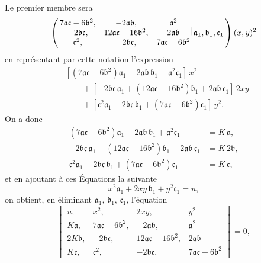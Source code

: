 \documentclass[11pt,a4paper]{book}
\theoremstyle{plain}
\newcommand{\wrule}{\hspace{-0.1em}\mid\hspace{-0.1em}}
\begin{document}
Le premier membre sera
\[
\left(\,\begin{matrix} 7\mathfrak{a}\mathfrak{c}-6\mathfrak{b}^2, & -2\mathfrak{a}\mathfrak{b}, & \mathfrak{a}^2\\
-2\mathfrak{b}\mathfrak{c}, & 12\mathfrak{a}\mathfrak{c}-16\mathfrak{b}^2, & 2\mathfrak{a}\mathfrak{b}\\
\mathfrak{c}^2, & -2\mathfrak{b}\mathfrak{c}, & 7\mathfrak{a}\mathfrak{c}-6\mathfrak{b}^2\end{matrix}\,\raisebox{0.5ex}{$\wrule$}\,\mathfrak{a}_1,\mathfrak{b}_1,\mathfrak{c}_1\,\right)(x,y)^2
\]
en repr\'{e}sentant par cette notation l'expression
\begin{align*}
&[(7\mathfrak{a}\mathfrak{c}-6\mathfrak{b}^2)\mathfrak{a}_1-2\mathfrak{a}\mathfrak{b}\,\mathfrak{b}_1+\mathfrak{a}^2\mathfrak{c}_1]\,x^2\\
&\qquad +[-2\mathfrak{b}\mathfrak{c}\,\mathfrak{a}_1+(12\mathfrak{a}\mathfrak{c}-16\mathfrak{b}^2)\mathfrak{b}_1+2\mathfrak{a}\mathfrak{b}\,\mathfrak{c}_1]\,2xy\\
&\qquad +[\mathfrak{c}^2\mathfrak{a}_1-2\mathfrak{b}\mathfrak{c}\,\mathfrak{b}_1+(7\mathfrak{a}\mathfrak{c}-6\mathfrak{b}^2)\mathfrak{c}_1]\,y^2.
\end{align*}
On a donc
\begin{align*}
(7\mathfrak{a}\mathfrak{c}-6\mathfrak{b}^2)\mathfrak{a}_1-2\mathfrak{a}\mathfrak{b}\,\mathfrak{b}_1+\mathfrak{a}^2\mathfrak{c}_1 &= K\,\mathfrak{a},\\
-2\mathfrak{b}\mathfrak{c}\,\mathfrak{a}_1+(12\mathfrak{a}\mathfrak{c}-16\mathfrak{b}^2)\mathfrak{b}_1+2\mathfrak{a}\mathfrak{b}\,\mathfrak{c}_1 &= K\,2\mathfrak{b},\\
\mathfrak{c}^2\mathfrak{a}_1-2\mathfrak{b}\mathfrak{c}\,\mathfrak{b}_1+(7\mathfrak{a}\mathfrak{c}-6\mathfrak{b}^2)\mathfrak{c}_1 &= K\,\mathfrak{c},
\end{align*}
et en ajoutant \`{a} ces \'{E}quations la suivante
\[
x^2\mathfrak{a}_1+2xy\,\mathfrak{b}_1+y^2\mathfrak{c}_1=u,
\]
on obtient, en \'{e}liminant $\mathfrak{a}_1$, $\mathfrak{b}_1$, $\mathfrak{c}_1$, l'\'{e}quation
\[
\begin{vmatrix}
u, & x^2, & 2xy, & y^2\\
K\mathfrak{a}, & 7\mathfrak{a}\mathfrak{c}-6\mathfrak{b}^2, & -2\mathfrak{a}\mathfrak{b}, & \mathfrak{a}^2\\
2K\mathfrak{b}, & -2\mathfrak{b}\mathfrak{c}, & 12\mathfrak{a}\mathfrak{c}-16\mathfrak{b}^2, & 2\mathfrak{a}\mathfrak{b}\\
K\mathfrak{c}, & \mathfrak{c}^2, & -2\mathfrak{b}\mathfrak{c}, & 7\mathfrak{a}\mathfrak{c}-6\mathfrak{b}^2
\end{vmatrix}=0,
\]
\end{document}
